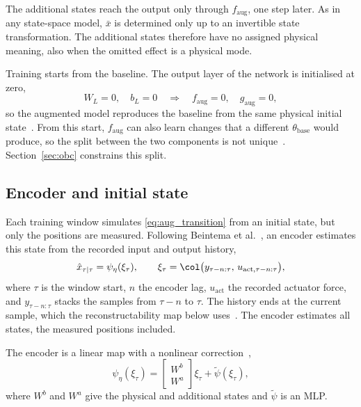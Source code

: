 The additional states reach the output only through $f_{\mathrm{aug}}$, one
step later.
As in any state-space model, $\bar x$ is determined only up to an invertible
state transformation.
The additional states therefore have no assigned physical meaning, also when
the omitted effect is a physical mode.

Training starts from the baseline.
The output layer of the network is initialised at zero,
\begin{equation}
 W_L=0,\quad b_L=0
 \quad\Longrightarrow\quad
 f_{\mathrm{aug}}=0,\quad g_{\mathrm{aug}}=0 ,
 \label{eq:aug_zero_init}
\end{equation}
so the augmented model reproduces the baseline from the same physical
initial state~\cite[Eq.~(29)]{hoekstra2026lfr}.
From this start, $f_{\mathrm{aug}}$ can also learn changes that a different
$\theta_{\mathrm{base}}$ would produce, so the split between the two
components is not unique~\cite[Sec.~5.2]{hoekstra2026lfr}.
Section~\ref{sec:obc} constrains this split.

\subsection{Encoder and initial state}\label{sec:aug_encoder}
Each training window simulates \eqref{eq:aug_transition} from an initial
state, but only the positions are measured.
Following Beintema et al.~\cite{beintema2023subnet}, an encoder estimates
this state from the recorded input and output history,
\begin{equation}
 \hat x_{\tau|\tau}
 =\psi_\eta(\xi_\tau),\qquad
 \xi_\tau=\col\bigl(y_{\tau-n:\tau},\,u_{\mathrm{act},\tau-n:\tau}\bigr),
 \label{eq:aug_encoder}
\end{equation}
where $\tau$ is the window start, $n$ the encoder lag,
$u_{\mathrm{act}}$ the recorded actuator force, and $y_{\tau-n:\tau}$
stacks the samples from $\tau-n$ to $\tau$.
The history ends at the current sample, which the reconstructability map
below uses~\cite[Eq.~(15)]{hoekstra2026encoder}.
The encoder estimates all states, the measured positions included.

The encoder is a linear map with a nonlinear
correction~\cite[Eq.~(8)]{hoekstra2026encoder},
\begin{equation}
 \psi_\eta(\xi_\tau)
 =\begin{bmatrix}W^b\\ W^a\end{bmatrix}\xi_\tau+\tilde\psi(\xi_\tau),
 \label{eq:aug_enc_lin}
\end{equation}
where $W^b$ and $W^a$ give the physical and additional states and
$\tilde\psi$ is an MLP.

